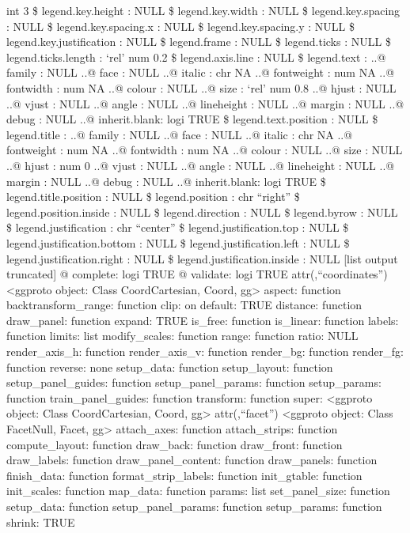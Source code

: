 \documentclass[
]{article}
\begin{document}
int 3 \$ legend.key.height : NULL \$ legend.key.width : NULL \$
legend.key.spacing : NULL \$ legend.key.spacing.x : NULL \$
legend.key.spacing.y : NULL \$ legend.key.justification : NULL \$
legend.frame : NULL \$ legend.ticks : NULL \$ legend.ticks.length :
`rel' num 0.2 \$ legend.axis.line : NULL \$ legend.text : ..@ family :
NULL ..@ face : NULL ..@ italic : chr NA ..@ fontweight : num NA ..@
fontwidth : num NA ..@ colour : NULL ..@ size : `rel' num 0.8 ..@ hjust
: NULL ..@ vjust : NULL ..@ angle : NULL ..@ lineheight : NULL ..@
margin : NULL ..@ debug : NULL ..@ inherit.blank: logi TRUE \$
legend.text.position : NULL \$ legend.title : ..@ family : NULL ..@ face
: NULL ..@ italic : chr NA ..@ fontweight : num NA ..@ fontwidth : num
NA ..@ colour : NULL ..@ size : NULL ..@ hjust : num 0 ..@ vjust : NULL
..@ angle : NULL ..@ lineheight : NULL ..@ margin : NULL ..@ debug :
NULL ..@ inherit.blank: logi TRUE \$ legend.title.position : NULL \$
legend.position : chr ``right'' \$ legend.position.inside : NULL \$
legend.direction : NULL \$ legend.byrow : NULL \$ legend.justification :
chr ``center'' \$ legend.justification.top : NULL \$
legend.justification.bottom : NULL \$ legend.justification.left : NULL
\$ legend.justification.right : NULL \$ legend.justification.inside :
NULL {[}list output truncated{]} @ complete: logi TRUE @ validate: logi
TRUE attr(,``coordinates'') \textless ggproto object: Class
CoordCartesian, Coord, gg\textgreater{} aspect: function
backtransform\_range: function clip: on default: TRUE distance: function
draw\_panel: function expand: TRUE is\_free: function is\_linear:
function labels: function limits: list modify\_scales: function range:
function ratio: NULL render\_axis\_h: function render\_axis\_v: function
render\_bg: function render\_fg: function reverse: none setup\_data:
function setup\_layout: function setup\_panel\_guides: function
setup\_panel\_params: function setup\_params: function
train\_panel\_guides: function transform: function super:
\textless ggproto object: Class CoordCartesian, Coord, gg\textgreater{}
attr(,``facet'') \textless ggproto object: Class FacetNull, Facet,
gg\textgreater{} attach\_axes: function attach\_strips: function
compute\_layout: function draw\_back: function draw\_front: function
draw\_labels: function draw\_panel\_content: function draw\_panels:
function finish\_data: function format\_strip\_labels: function
init\_gtable: function init\_scales: function map\_data: function
params: list set\_panel\_size: function setup\_data: function
setup\_panel\_params: function setup\_params: function shrink: TRUE
\end{document}
